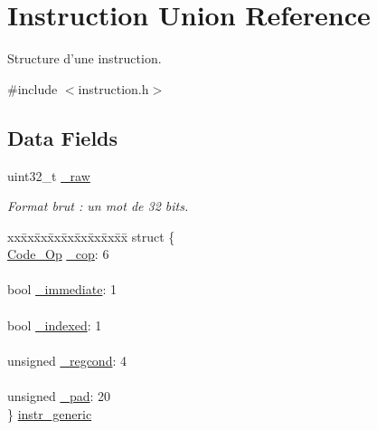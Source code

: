 \hypertarget{union_instruction}{\section{\-Instruction \-Union \-Reference}
\label{union_instruction}
}


\-Structure d'une instruction.  




{\ttfamily \#include $<$instruction.\-h$>$}

\subsection*{\-Data \-Fields}
\begin{DoxyCompactItemize}
\item 
uint32\-\_\-t \hyperlink{union_instruction_ae01e4320e4368174859b68c497135012}{\-\_\-raw}
\begin{DoxyCompactList}\small\item\em \-Format brut \-: un mot de 32 bits. \end{DoxyCompactList}\item 
\begin{tabbing}
xx\=xx\=xx\=xx\=xx\=xx\=xx\=xx\=xx\=\kill
struct \{\\
\>\hyperlink{instruction_8h_a5ead9d7413d75b14e895c945daa82de6}{Code\_Op} \hyperlink{union_instruction_a2eef4c29da07a7afefa510530aeabe8b}{\_cop}: 6\\
\>\\
\>bool \hyperlink{union_instruction_ae8f0aed9ccc5cc06e0689f32c409787d}{\_immediate}: 1\\
\>\\
\>bool \hyperlink{union_instruction_a49ff74dcae74d84b5fce96090bcbcd14}{\_indexed}: 1\\
\>\\
\>unsigned \hyperlink{union_instruction_aacc0d299ebbd857ec008b3c9e2ae2cd0}{\_regcond}: 4\\
\>\\
\>unsigned \hyperlink{union_instruction_a1516ca58cfa2a856fe67d47d67859fba}{\_pad}: 20\\
\} \hyperlink{union_instruction_a655fbddb807dcc35363d6149dbb26237}{instr\_generic}\\


\end{tabbing}
\end{DoxyCompactItemize}
